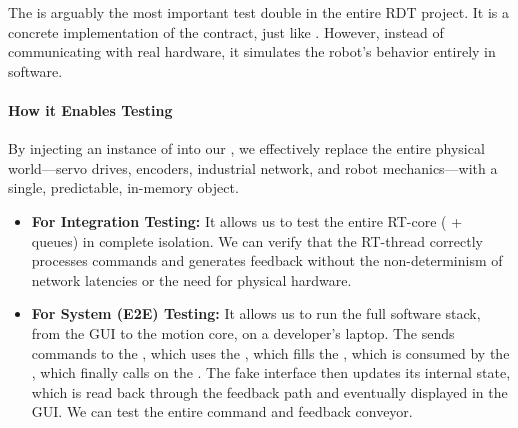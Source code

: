 The  is arguably the most important test double in the entire RDT project. It is a concrete implementation of the  contract, just like . However, instead of communicating with real hardware, it simulates the robot's behavior entirely in software.

\paragraph{How it Enables Testing}
By injecting an instance of  into our , we effectively replace the entire physical world—servo drives, encoders, industrial network, and robot mechanics—with a single, predictable, in-memory object.
\begin{itemize}
    \item \textbf{For Integration Testing:} It allows us to test the entire RT-core ( + queues) in complete isolation. We can verify that the RT-thread correctly processes commands and generates feedback without the non-determinism of network latencies or the need for physical hardware.
    \item \textbf{For System (E2E) Testing:} It allows us to run the full software stack, from the GUI to the motion core, on a developer's laptop. The  sends commands to the , which uses the , which fills the , which is consumed by the , which finally calls  on the . The fake interface then updates its internal state, which is read back through the feedback path and eventually displayed in the GUI. We can test the entire command and feedback conveyor.
\end{itemize}

